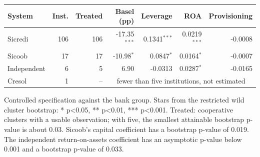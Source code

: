 \begin{tabular}{lrrrrrr}
\toprule
System & Inst. & Treated & Basel (pp) & Leverage & ROA & Provisioning \\
\midrule
Sicredi & 106 & 106 & -17.35$^{***}$ & 0.1341$^{***}$ & 0.0219$^{***}$ & -0.0008 \\
Sicoob & 17 & 17 & -10.98$^{*}$ & 0.0847$^{*}$ & 0.0164$^{*}$ & -0.0007 \\
Independent & 6 & 5 & 6.90 & -0.0313 & 0.0287$^{*}$ & -0.0165 \\
Cresol & 1 & -- & \multicolumn{4}{c}{fewer than five institutions, not estimated} \\
\bottomrule
\end{tabular}
\begin{tablenotes}[flushleft]\footnotesize
\item Controlled specification against the bank group. Stars from the restricted wild cluster bootstrap: * p<0.05, ** p<0.01, *** p<0.001. Treated: cooperative clusters with a usable observation; with five, the smallest attainable bootstrap p-value is about 0.03. Sicoob's capital coefficient has a bootstrap p-value of 0.019. The independent return-on-assets coefficient has an asymptotic p-value below 0.001 and a bootstrap p-value of 0.033.
\end{tablenotes}
